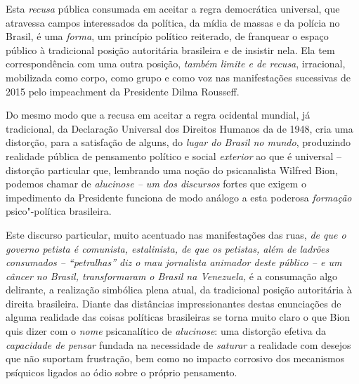 Esta \emph{recusa} pública consumada em aceitar a regra democrática
universal, que atravessa campos interessados da política, da mídia de
massas e da polícia no Brasil, é uma \emph{forma}, um princípio político
reiterado, de franquear o espaço público à tradicional posição
autoritária brasileira e de insistir nela. Ela tem correspondência com
uma outra posição, \emph{também limite e de recusa}, irracional,
mobilizada como corpo, como grupo e como voz nas manifestações
sucessivas de 2015 pelo impeachment da Presidente Dilma Rousseff.

Do mesmo modo que a recusa em aceitar a regra ocidental mundial, já
tradicional, da Declaração Universal dos Direitos Humanos da  de
1948, cria uma distorção, para a satisfação de alguns, do \emph{lugar do
Brasil no mundo}, produzindo realidade pública de pensamento político e
social \emph{exterior} ao que é universal -- distorção particular que,
lembrando uma noção do psicanalista Wilfred Bion, podemos chamar de
\emph{alucinose -- um dos discursos} fortes que exigem o impedimento da
Presidente funciona de modo análogo a esta poderosa \emph{formação}
psico"-política brasileira.

Este discurso particular, muito acentuado nas manifestações das ruas,
\emph{de que o governo petista é comunista, estalinista, de que os
petistas, além de ladrões consumados -- ``petralhas'' diz o mau
jornalista animador deste público -- e um câncer no Brasil,
transformaram o Brasil na Venezuela,} é a consumação algo delirante, a
realização simbólica plena atual, da tradicional posição autoritária à
direita brasileira. Diante das distâncias impressionantes destas
enunciações de alguma realidade das coisas políticas brasileiras se
torna muito claro o que Bion quis dizer com o \emph{nome} psicanalítico
de \emph{alucinose}: uma distorção efetiva da \emph{capacidade de
pensar} fundada na necessidade de \emph{saturar} a realidade com desejos
que não suportam frustração, bem como no impacto corrosivo dos
mecanismos psíquicos ligados ao ódio sobre o próprio pensamento.


